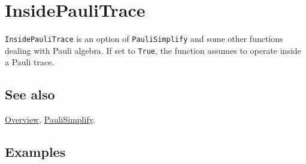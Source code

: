 \documentclass[../FeynCalcManual.tex]{subfiles}
\begin{document}
\hypertarget{insidepaulitrace}{%
\section{InsidePauliTrace}\label{insidepaulitrace}}

\texttt{InsidePauliTrace} is an option of \texttt{PauliSimplify} and
some other functions dealing with Pauli algebra. If set to
\texttt{True}, the function assumes to operate inside a Pauli trace.

\subsection{See also}

\hyperlink{toc}{Overview}, \hyperlink{paulisimplify}{PauliSimplify}.

\subsection{Examples}
\end{document}
